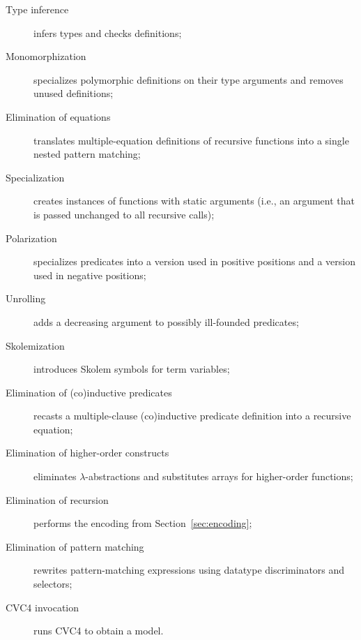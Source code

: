 \begin{description}
  \item[Type inference] infers types and checks definitions;
  \item[Monomorphization]
    specializes polymorphic definitions on their type arguments and removes
    unused definitions;
  \item[Elimination of equations]
    translates multiple-equation definitions of recursive functions into
      a single nested pattern matching;
  \item[Specialization]
    creates instances of functions with static arguments (i.e., an argument
    that is passed unchanged to all recursive calls);
  \item[Polarization]
    specializes predicates into a version used in positive positions
      and a version used in negative positions;
  \item[Unrolling]
    adds a decreasing argument to possibly ill-founded predicates; %
  \item[Skolemization]
    introduces Skolem symbols for term variables;
  \item[Elimination of (co)inductive predicates]
    recasts a multiple-clause (co)inductive predicate definition
      into a recursive equation;
  \item[Elimination of higher-order constructs]
    eliminates $\lambda$-abstractions and substitutes arrays for
    higher-order functions;
  \item[Elimination of recursion]
    performs the encoding from Section~\ref{sec:encoding};
  \item[Elimination of pattern matching]
    rewrites pattern-matching expressions using datatype
    discriminators and selectors;
  \item[CVC4 invocation] runs CVC4 to obtain a model.
\end{description}

